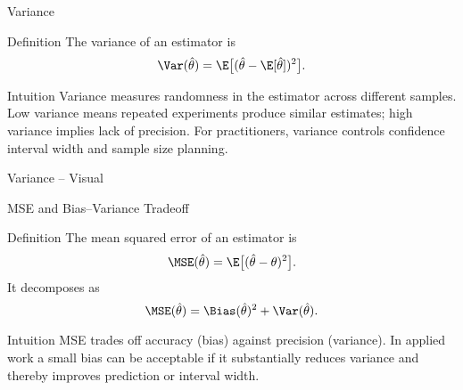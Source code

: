 \begin{frame}{Variance}
  \begin{block}{Definition}
    The variance of an estimator is
    \[\Var(\hat{\theta}) = \E\big[(\hat{\theta} - \E[\hat{\theta}])^2\big].\]
  \end{block}

  \begin{block}{Intuition}
    Variance measures randomness in the estimator across different samples.
    Low variance means repeated experiments produce similar estimates; high
    variance implies lack of precision. For practitioners, variance controls
    confidence interval width and sample size planning.
  \end{block}

  \vspace{1em}
\end{frame}

\begin{frame}{Variance -- Visual}
  \begin{center}
    \begin{adjustbox}{max height=0.40\textheight}
    \end{adjustbox}
  \end{center}
\end{frame}

\begin{frame}{MSE and Bias--Variance Tradeoff}
  \begin{block}{Definition}
    The mean squared error of an estimator is
    \[\MSE(\hat{\theta}) = \E\big[(\hat{\theta} - \theta)^2\big].\]
    It decomposes as
    \[\MSE(\hat{\theta}) = \Bias(\hat{\theta})^2 + \Var(\hat{\theta}).\]
  \end{block}

  \begin{block}{Intuition}
    MSE trades off accuracy (bias) against precision (variance). In applied work
    a small bias can be acceptable if it substantially reduces variance and
    thereby improves prediction or interval width.
  \end{block}

      \vspace{1em}
      \end{frame}

